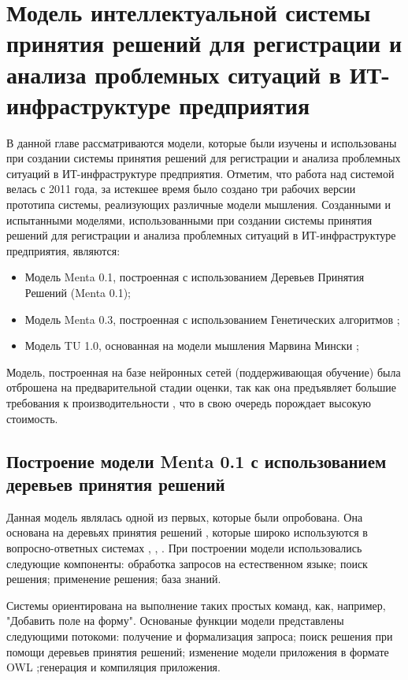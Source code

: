 \chapter{Модель интеллектуальной системы принятия решений для регистрации и анализа проблемных ситуаций в ИТ-инфраструктуре предприятия} \label{chapt3}

В данной главе рассматриваются модели, которые были изучены и использованы при создании системы принятия решений для регистрации и анализа проблемных ситуаций в ИТ-инфраструктуре предприятия. Отметим, что работа над системой велась с 2011 года, за истекшее время было создано три рабочих версии прототипа системы, реализующих различные модели мышления.
Созданными и испытанными моделями, использованными при создании системы принятия решений для регистрации и анализа проблемных ситуаций в ИТ-инфраструктуре предприятия, являются:
 \begin{itemize}
	\item Модель Menta 0.1, построенная с использованием Деревьев Принятия Решений (Menta 0.1);
	\item Модель Menta 0.3, построенная с использованием Генетических алгоритмов \cite{ArtificialIntelligence} ;
	\item Модель TU 1.0, основанная на модели мышления Марвина Мински  \cite{EmotionMachine};
\end{itemize}

Модель, построенная на базе нейронных сетей (поддерживающая обучение) была отброшена на предварительной стадии оценки, так как она предъявляет большие требования к производительности \cite{NEURAL}, что в свою очередь порождает высокую стоимость.


\section{Построение модели Menta 0.1 с использованием деревьев принятия решений} \label{sect3_1}
Данная модель являлась одной из первых, которые были опробована. Она основана на деревьях принятия решений \cite{DTREE}, которые широко используются в вопросно-ответных системах \cite{DC1}, \cite{DC2}, \cite{DC3}. При построении модели использовались следующие компоненты: обработка запросов на естественном языке; поиск решения; применение решения; база знаний.\par
Системы ориентирована на выполнение таких простых команд, как, например, "Добавить поле на форму". Основаные функции модели представлены следующими потокоми: получение и формализация запроса; поиск решения при помощи деревьев принятия решений; изменение модели приложения в формате OWL \cite{OWL};генерация и компиляция приложения.

